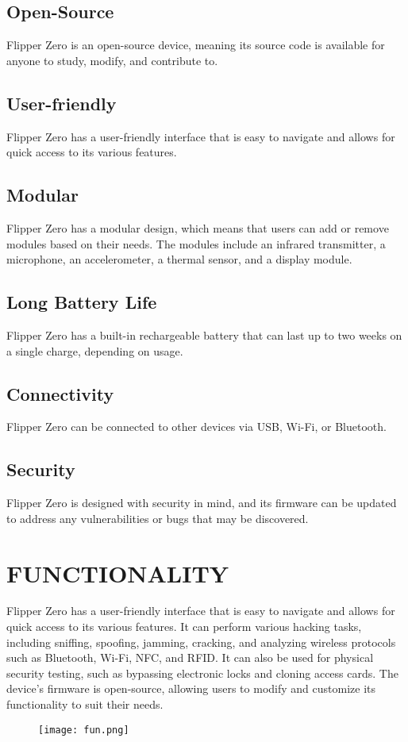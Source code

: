 \documentclass[a4paper,11pt]{report}
\begin{document}
\section{Open-Source}
Flipper Zero is an open-source device, meaning its source code is available for anyone to study, modify, and contribute to.
\section{User-friendly}
Flipper Zero has a user-friendly interface that is easy to navigate and allows for quick access to its various features.
\section{Modular}
Flipper Zero has a modular design, which means that users can add or remove modules based on their needs. The modules include an infrared transmitter, a microphone, an accelerometer, a thermal sensor, and a display module.
\section{Long Battery Life}
Flipper Zero has a built-in rechargeable battery that can last up to two weeks on a single charge, depending on usage.
\section{Connectivity}
Flipper Zero can be connected to other devices via USB, Wi-Fi, or Bluetooth.
\section{Security}
Flipper Zero is designed with security in mind, and its firmware can be updated to address any vulnerabilities or bugs that may be discovered.

\chapter{FUNCTIONALITY}
Flipper Zero has a user-friendly interface that is easy to navigate and allows for quick access to its various features. It can perform various hacking tasks, including sniffing, spoofing, jamming, cracking, and analyzing wireless protocols such as Bluetooth, Wi-Fi, NFC, and RFID. It can also be used for physical security testing, such as bypassing electronic locks and cloning access cards. The device's firmware is open-source, allowing users to modify and customize its functionality to suit their needs.
\begin{figure}[h]
	\centering
	\hspace{21pt}
	\texttt{[image: fun.png]}
	\label{fig:type.png}
\end{figure}
\end{document}
